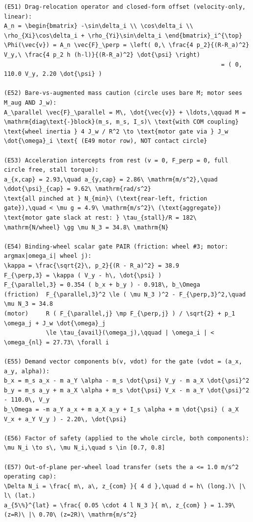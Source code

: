 \documentclass[11pt]{article}
\begin{document}
\begin{lstlisting}
(E51) Drag-relocation operator and closed-form offset (velocity-only, linear):
A_n = \begin{bmatrix} -\sin\delta_i \\ \cos\delta_i \\ \rho_{Xi}\cos\delta_i + \rho_{Yi}\sin\delta_i \end{bmatrix}_i^{\top}
\Phi(\vec{v}) = A_n \vec{F}_\perp = \left( 0,\ \frac{4 p_2}{(R-R_a)^2} V_y,\ \frac{4 p_2 h (h-l)}{(R-R_a)^2} \dot{\psi} \right)
                                                              = ( 0, 110.0 V_y, 2.20 \dot{\psi} )

(E52) Bare-vs-augmented mass caution (circle uses bare M; motor sees M_aug AND J_w):
A_\parallel \vec{F}_\parallel = M\, \dot{\vec{v}} + \ldots,\qquad M = \mathrm{diag\text{-}block}(m_s, m_s, I_s)\ \text{with COM coupling}
\text{wheel inertia } 4 J_w / R^2 \to \text{motor gate via } J_w \dot{\omega}_i \text{ (E49 motor row), NOT contact circle}

(E53) Acceleration intercepts from rest (v = 0, F_perp = 0, full circle free, stall torque):
a_{x,cap} = 2.93,\quad a_{y,cap} = 2.86\ \mathrm{m/s^2},\quad \ddot{\psi}_{cap} = 9.62\ \mathrm{rad/s^2}
\text{all pinched at } N_{min}\ (\text{rear-left, friction gate}),\quad < \mu g = 4.9\ \mathrm{m/s^2}\ (\text{aggregate})
\text{motor gate slack at rest: } \tau_{stall}/R = 182\ \mathrm{N/wheel} \gg \mu N_3 = 34.8\ \mathrm{N}

(E54) Binding-wheel scalar gate PAIR (friction: wheel #3; motor: argmax|omega_i| wheel j):
\kappa = \frac{\sqrt{2}\, p_2}{(R - R_a)^2} = 38.9
F_{\perp,3} = \kappa ( V_y - h\, \dot{\psi} )
F_{\parallel,3} = 0.354 ( b_x + b_y ) - 0.918\, b_\Omega
(friction)  F_{\parallel,3}^2 \le ( \mu N_3 )^2 - F_{\perp,3}^2,\quad \mu N_3 = 34.8
(motor)     R ( F_{\parallel,j} \mp F_{\perp,j} ) / \sqrt{2} + p_1 \omega_j + J_w \dot{\omega}_j
            \le \tau_{avail}(\omega_j),\qquad | \omega_i | < \omega_{nl} = 27.73\ \forall i

(E55) Demand vector components b(v, vdot) for the gate (vdot = (a_x, a_y, alpha)):
b_x = m_s a_x - m a_Y \alpha - m_s \dot{\psi} V_y - m a_X \dot{\psi}^2
b_y = m_s a_y + m a_X \alpha + m_s \dot{\psi} V_x - m a_Y \dot{\psi}^2 - 110.0\, V_y
b_\Omega = -m a_Y a_x + m a_X a_y + I_s \alpha + m \dot{\psi} ( a_X V_x + a_Y V_y ) - 2.20\, \dot{\psi}

(E56) Factor of safety (applied to the whole circle, both components):
\mu N_i \to s\, \mu N_i,\quad s \in [0.7, 0.8]

(E57) Out-of-plane per-wheel load transfer (sets the a <= 1.0 m/s^2 operating cap):
\Delta N_i = \frac{ m\, a\, z_{com} }{ 4 d },\quad d = h\ (long.)\ |\ l\ (lat.)
a_{5\%}^{lat} = \frac{ 0.05 \cdot 4 l N_3 }{ m\, z_{com} } = 1.39\ (z=R)\ |\ 0.70\ (z=2R)\ \mathrm{m/s^2}


\end{lstlisting}
\end{document}
